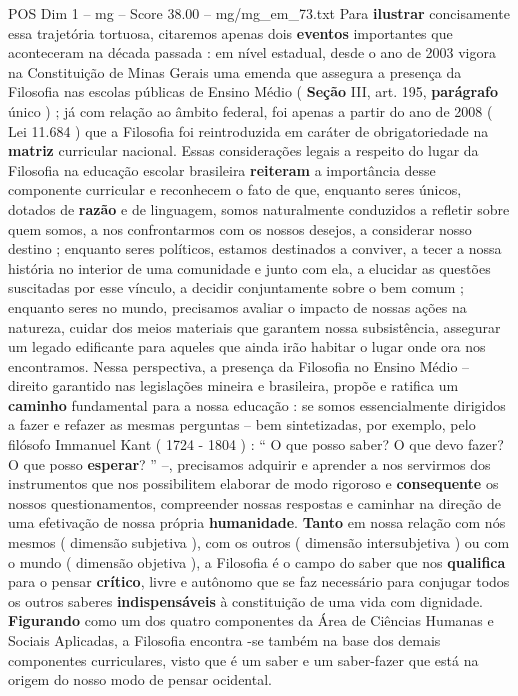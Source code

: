 \begin{textsample}{POS Dim 1 – mg – Score 38.00 – mg/mg\_em\_73.txt}
Para \textbf{ilustrar} concisamente essa trajetória tortuosa, citaremos apenas dois \textbf{eventos} importantes que aconteceram na década passada : em nível estadual, desde o ano de 2003 vigora na Constituição de Minas Gerais uma emenda que assegura a presença da Filosofia nas escolas públicas de Ensino Médio ( \textbf{Seção} III, art. 195, \textbf{parágrafo} único ) ; já com relação ao âmbito federal, foi apenas a partir do ano de 2008 ( Lei 11.684 ) que a Filosofia foi reintroduzida em caráter de obrigatoriedade na \textbf{matriz} curricular nacional.
Essas considerações legais a respeito do lugar da Filosofia na educação escolar brasileira \textbf{reiteram} a importância desse componente curricular e reconhecem o fato de que, enquanto seres únicos, dotados de \textbf{razão} e de linguagem, somos naturalmente conduzidos a refletir sobre quem somos, a nos confrontarmos com os nossos desejos, a considerar nosso destino ; enquanto seres políticos, estamos destinados a conviver, a tecer a nossa história no interior de uma comunidade e junto com ela, a elucidar as questões suscitadas por esse vínculo, a decidir conjuntamente sobre o bem comum ; enquanto seres no mundo, precisamos avaliar o impacto de nossas ações na natureza, cuidar dos meios materiais que garantem nossa subsistência, assegurar um legado edificante para aqueles que ainda irão habitar o lugar onde ora nos encontramos.
Nessa perspectiva, a presença da Filosofia no Ensino Médio – direito garantido nas legislações mineira e brasileira, propõe e ratifica um \textbf{caminho} fundamental para a nossa educação : se somos essencialmente dirigidos a fazer e refazer as mesmas perguntas – bem sintetizadas, por exemplo, pelo filósofo Immanuel Kant ( 1724 - 1804 ) : “ O que posso saber?
O que devo fazer?
O que posso \textbf{esperar}? ” –, precisamos adquirir e aprender a nos servirmos dos instrumentos que nos possibilitem elaborar de modo rigoroso e \textbf{consequente} os nossos questionamentos, compreender nossas respostas e caminhar na direção de uma efetivação de nossa própria \textbf{humanidade}. \textbf{Tanto} em nossa relação com nós mesmos ( dimensão subjetiva ), com os outros ( dimensão intersubjetiva ) ou com o mundo ( dimensão objetiva ), a Filosofia é o campo do saber que nos \textbf{qualifica} para o pensar \textbf{crítico}, livre e autônomo que se faz necessário para conjugar todos os outros saberes \textbf{indispensáveis} à constituição de uma vida com dignidade. \textbf{Figurando} como um dos quatro componentes da Área de Ciências Humanas e Sociais Aplicadas, a Filosofia encontra -se também na base dos demais componentes curriculares, visto que é um saber e um saber-fazer que está na origem do nosso modo de pensar ocidental.

\end{textsample}
